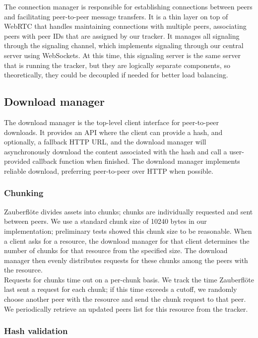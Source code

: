 \documentclass[letterpaper,twocolumn,10pt]{article}
\newcommand{\zbf}{Zauberfl\"{o}te\xspace}
\begin{document}
The connection manager is responsible for establishing connections between
peers and facilitating peer-to-peer message transfers. It is a thin layer on
top of WebRTC that handles maintaining connections with multiple peers,
associating peers with peer IDs that are assigned by our tracker. It manages
all signaling through the signaling channel, which implements signaling through
our central server using WebSockets. At this time, this signaling server is the
same server that is running the tracker, but they are logically separate
components, so theoretically, they could be decoupled if needed for better load
balancing.

\subsection{Download manager}

The download manager is the top-level client interface for peer-to-peer
downloads. It provides an API where the client can provide a hash, and
optionally, a fallback HTTP URL, and the download manager will asynchronously
download the content associated with the hash and call a user-provided callback
function when finished. The download manager implements reliable download,
preferring peer-to-peer over HTTP when possible.

\subsubsection{Chunking}

\zbf divides assets into chunks; chunks are individually requested and
sent between peers. We use a standard chunk size of 10240 bytes in our
implementation; preliminary tests showed this chunk size to be reasonable.
When a client asks for a resource, the download manager for that client
determines the number of chunks for that resource from the specified size.
The download manager then evenly distributes requests for these chunks
among the peers with the resource. \\
Requests for chunks time out on a per-chunk basis. We track the time \zbf
last sent a request for each chunk; if this time exceeds a cutoff, we randomly
choose another peer with the resource and send the chunk request to that
peer. We periodically retrieve an updated peers list for this resource
from the tracker.

\subsubsection{Hash validation}
\end{document}
